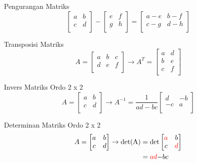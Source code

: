 \documentclass{report}
\begin{document}
\begin{enumerate}
Pengurangan Matriks
\begin{equation}
\label{max_sub}
	\begin{bmatrix}
		a & b \\
		c & d \\
	\end{bmatrix}
	-
	\begin{bmatrix}
		e & f \\
		g & h \\
	\end{bmatrix}
	= 
	\begin{bmatrix}
		a - e & b - f \\
		c - g & d - h \\
	\end{bmatrix}
\end{equation}

Transposisi Matriks
\begin{equation}
\label{max_transp}
    A = \begin{bmatrix}
		a & b & c\\
		d & e & f\\
	\end{bmatrix}
	\to
	A^{T} = \begin{bmatrix}
		a & d \\
		b & e \\
		c & f \\
	\end{bmatrix}
\end{equation}

Invers Matriks Ordo 2 x 2
\begin{equation}
\label{max_inv_2}
    A = \begin{bmatrix}
		a & b \\
		c & d \\
	\end{bmatrix}
	\to
	A^{-1} = 
	\frac{1}{ad-bc}
	\begin{bmatrix}
		d & -b \\
		-c & a \\
	\end{bmatrix}
\end{equation}

Determinan Matriks Ordo 2 x 2
\begin{equation}
\begin{split}
\label{max_det_2}
    A = 
	\begin{bmatrix}
		a & b \\
		c & d \\
	\end{bmatrix}
	\to \text{det(A)} &= 
	\text{det}
		\begin{bmatrix}
			\color{red}a & b \\
			c & \color{red}d \\
		\end{bmatrix} \\
	&= \color{red}{ad}\color{black}{-bc}
\end{split}
\end{equation}


\end{enumerate}
\end{document}
